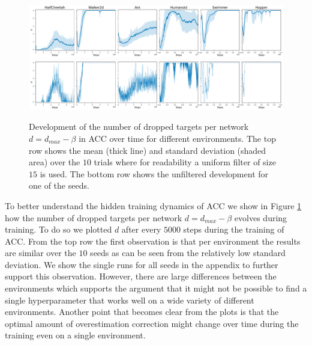 \begin{figure}[b]
  \includegraphics[width=1\linewidth]{images/analysis/visualize_beta_all_envs.pdf}
  \includegraphics[width=1\linewidth]{images/analysis/visualize_beta_one_run_all_envs.pdf}
\caption{Development of the number of dropped targets per network $d=d_{max}-\beta$ in ACC over time for different environments. The top row shows the mean (thick line) and standard deviation (shaded area) over the $10$ trials where for readability a uniform filter of size $15$ is used.
The bottom row shows the unfiltered development for one of the seeds.}
\label{fig:num_dropped_targets_all_envs}
\end{figure}




To better understand the hidden training dynamics of ACC we show in 
Figure \ref{fig:num_dropped_targets_all_envs}
how the number of dropped targets per network $d=d_{max}-\beta$ evolves during training. 
To do so we plotted $d$ after every $5000$ steps during the training of ACC.
From the top row the first observation is that per environment the results are similar over the $10$ seeds as can be seen from the relatively low standard deviation. We show the single runs for all seeds in the appendix to further support this observation.
However, there are large differences between the environments which supports the argument that it might not be possible to find a single hyperparameter that works well on a wide variety of different environments.
Another point that becomes clear from the plots is that the optimal amount of overestimation correction might change over time during the training even on a single environment.

